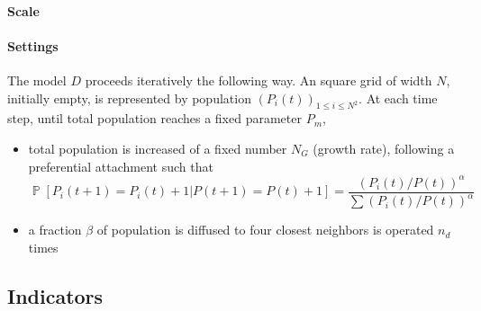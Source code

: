 \documentclass[10pt,letterpaper]{article}
\DeclareMathOperator{\Proba}{\mathbb{P}}
\newcommand{\Pb}[1]{\ensuremath{\Proba\!\left[#1\right]}}
\begin{document}
\paragraph{Scale}



\paragraph{Settings}


The model $D$ proceeds iteratively the following way. An square grid of width $N$, initially empty, is represented by population $(P_i(t))_{1\leq i\leq N^2}$. At each time step, until total population reaches a fixed parameter $P_m$,
\begin{itemize}
\item total population is increased of a fixed number $N_G$ (growth rate), following a preferential attachment such that 
\[\Pb{P_i(t+1)=P_i(t)+1|P(t+1)=P(t)+1}=\frac{(P_i(t)/P(t))^{\alpha}}{\sum(P_i(t)/P(t))^{\alpha}}\]
\item a fraction $\beta$ of population is diffused to four closest neighbors is operated $n_d$ times
\end{itemize}









\subsection*{Indicators}






\end{document}
